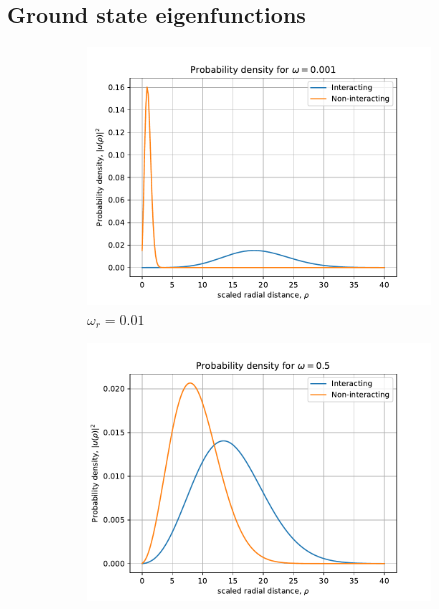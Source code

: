 \documentclass[a4paper, 10pt]{article}
\begin{document}
\subsection{Ground state eigenfunctions}



\begin{figure}[H]
        \centering
        \begin{subfigure}[b]{0.42\textwidth}
            \centering
            \includegraphics[width=\textwidth]{Probability_density_w001.pdf}
            \caption{$\omega_{r} = 0.01$}
        \end{subfigure}
        \hfill
        \begin{subfigure}[b]{0.42\textwidth}
            \centering
            \includegraphics[width=\textwidth]{Probability_density_w05.pdf}

\end{subfigure}
\end{figure}
\end{document}
